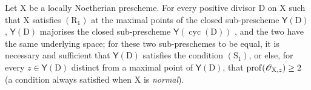 \begin{corollary}[21.7.3]
\label{IV.21.7.3}
Let $\mathrm{X}$ be a locally Noetherian prescheme.
For every positive divisor $\mathrm{D}$ on $\mathrm{X}$ such that $\mathrm{X}$ satisfies $(\mathrm{R}_1)$ at the maximal points of the closed sub-prescheme $\boldsymbol{\mathsf{Y}}(\mathrm{D})$ , $\boldsymbol{\mathsf{Y}}(\mathrm{D})$ majorises the closed sub-prescheme $\boldsymbol{\mathsf{Y}}(\operatorname{cyc}(\mathrm{D}))$ , and the two have the same underlying space;
for these two sub-preschemes to be equal, it is necessary and sufficient that $\boldsymbol{\mathsf{Y}}(\mathrm{D})$ satisfies the condition $(\mathrm{S}_1)$, or else, for every $z\in\boldsymbol{\mathsf{Y}}(\mathrm{D})$ distinct from a maximal point of $\boldsymbol{\mathsf{Y}}(\mathrm{D})$, that $\operatorname{prof}(\mathscr{O}_{\mathrm{X},z})\geq 2$ \textup{(a condition always satisfied when $\mathrm{X}$ is \emph{normal})}.
\end{corollary}

